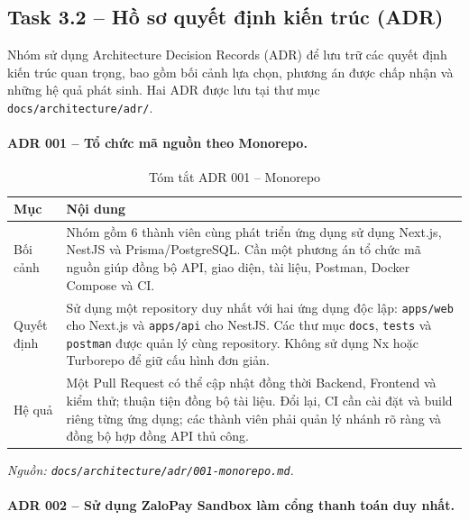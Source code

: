 \subsection{Task 3.2 -- Hồ sơ quyết định kiến trúc (ADR)}

Nhóm sử dụng Architecture Decision Records (ADR) để lưu trữ các quyết định kiến trúc quan trọng, bao gồm bối cảnh lựa chọn, phương án được chấp nhận và những hệ quả phát sinh. Hai ADR được lưu tại thư mục \texttt{docs/architecture/adr/}.

\paragraph{ADR 001 -- Tổ chức mã nguồn theo Monorepo.}

\begin{table}[H]
\centering
\small
\caption{Tóm tắt ADR 001 -- Monorepo}
\label{tabB:adr1}
\begin{tabularx}{\textwidth}{@{}p{2.3cm} X@{}}
\toprule
\textbf{Mục} & \textbf{Nội dung} \\
\midrule

Bối cảnh &
Nhóm gồm 6 thành viên cùng phát triển ứng dụng sử dụng Next.js, NestJS và Prisma/PostgreSQL. Cần một phương án tổ chức mã nguồn giúp đồng bộ API, giao diện, tài liệu, Postman, Docker Compose và CI. \\

Quyết định &
Sử dụng một repository duy nhất với hai ứng dụng độc lập: \texttt{apps/web} cho Next.js và \texttt{apps/api} cho NestJS. Các thư mục \texttt{docs}, \texttt{tests} và \texttt{postman} được quản lý cùng repository. Không sử dụng Nx hoặc Turborepo để giữ cấu hình đơn giản. \\

Hệ quả &
Một Pull Request có thể cập nhật đồng thời Backend, Frontend và kiểm thử; thuận tiện đồng bộ tài liệu. Đổi lại, CI cần cài đặt và build riêng từng ứng dụng; các thành viên phải quản lý nhánh rõ ràng và đồng bộ hợp đồng API thủ công. \\

\bottomrule
\end{tabularx}
\end{table}

\textit{Nguồn: \texttt{docs/architecture/adr/001-monorepo.md}.}

\paragraph{ADR 002 -- Sử dụng ZaloPay Sandbox làm cổng thanh toán duy nhất.}

